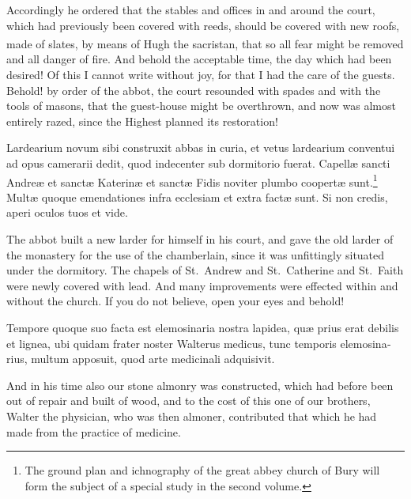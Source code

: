 \documentclass{book}
\newcounter{engnote}
\newcommand{\engnotenum}{\textsuperscript{\arabic{engnote}\stepcounter{engnote}}}
\begin{document}
\begin{paracol}{2}
\switchcolumn

Accordingly he ordered that the stables and offices in and around the court, which had previously been covered with reeds, should be covered with new roofs, made of slates, by means of Hugh the sacristan,\engnotenum{} that so all fear might be removed and all danger of fire. And behold the acceptable time, the day which had been desired! Of this I cannot write without joy, for that I had the care of the guests. Behold! by order of the abbot, the court resounded with spades and with the tools of masons, that the guest-house might be overthrown, and now was almost entirely razed, since the Highest planned its restoration!

\switchcolumn*

\begin{otherlanguage}{latin}
Lardearium novum sibi construxit abbas in curia, et vetus lardearium conventui ad opus camerarii dedit, quod indecenter sub dormitorio fuerat. Capell\ae{} sancti Andre\ae{} et sanct\ae{} Katerin\ae{} et sanct\ae{} Fidis noviter plumbo coopert\ae{} sunt.\footnote[\textdagger]{The ground plan and ichnography of the great abbey church of Bury will form the subject of a special study in the second volume.} Mult\ae{} quoque emendationes infra ecclesiam et extra fact\ae{} sunt. Si non credis, aperi oculos tuos et vide. 
\end{otherlanguage}

\switchcolumn

The abbot built a new larder for himself in his court, and gave the old larder of the monastery for the use of the chamberlain, since it was unfittingly situated under the dormitory. The chapels of St.\ Andrew and St.\ Catherine and St.\ Faith were newly covered with lead. And many improvements were effected within and without the church. If you do not believe, open your eyes and behold!

\switchcolumn*

\begin{otherlanguage}{latin}
Tempore quoque suo facta est elemosinaria nostra lapidea, qu\ae{} prius erat debilis et lignea, ubi quidam frater noster Walterus medicus, tunc temporis elemosinarius, multum apposuit, quod arte medicinali adquisivit.
\end{otherlanguage}

\switchcolumn

And in his time also our stone almonry was constructed, which had before been out of repair and built of wood, and to the cost of this one of our brothers, Walter the physician, who was then almoner, contributed that which he had made from the practice of medicine.


\end{paracol}
\end{document}
